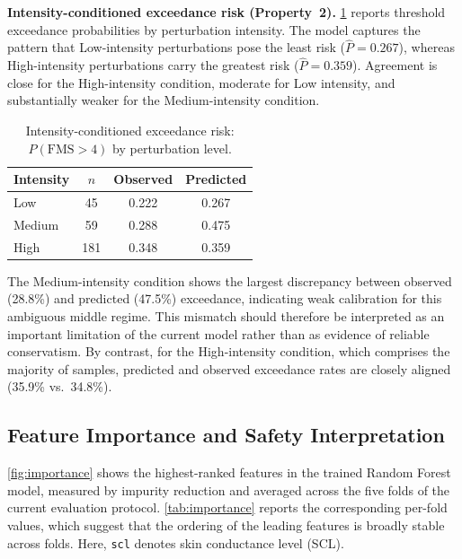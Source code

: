 \documentclass[review]{vgtc}              %
\begin{document}
\textbf{Intensity-conditioned exceedance risk (Property~2).}
\cref{tab:intensity_exc} reports threshold exceedance probabilities by perturbation intensity. The model captures the pattern that Low-intensity perturbations pose the least risk ($\hat{P} = 0.267$), whereas High-intensity perturbations carry the greatest risk ($\hat{P} = 0.359$). Agreement is close for the High-intensity condition, moderate for Low intensity, and substantially weaker for the Medium-intensity condition.

\begin{table}[tb]
\centering
\caption{Intensity-conditioned exceedance risk: $P(\text{FMS} > 4)$ by perturbation level.}
\begin{tabular}{lccc}
\toprule
\textbf{Intensity} & \textbf{$n$} & \textbf{Observed} & \textbf{Predicted} \\
\midrule
Low    & 45  & 0.222 & 0.267 \\
Medium & 59  & 0.288 & 0.475 \\
High   & 181 & 0.348 & 0.359 \\
\bottomrule
\end{tabular}
\label{tab:intensity_exc}
\end{table}

The Medium-intensity condition shows the largest discrepancy between observed (28.8\%) and predicted (47.5\%) exceedance, indicating weak calibration for this ambiguous middle regime. This mismatch should therefore be interpreted as an important limitation of the current model rather than as evidence of reliable conservatism. By contrast, for the High-intensity condition, which comprises the majority of samples, predicted and observed exceedance rates are closely aligned (35.9\% vs.\ 34.8\%).





\subsection{Feature Importance and Safety Interpretation}\label{sec:importance}

\cref{fig:importance} shows the highest-ranked features in the trained Random Forest model, measured by impurity reduction and averaged across the five folds of the current evaluation protocol. \cref{tab:importance} reports the corresponding per-fold values, which suggest that the ordering of the leading features is broadly stable across folds. Here, \texttt{scl} denotes skin conductance level (SCL).
\end{document}
